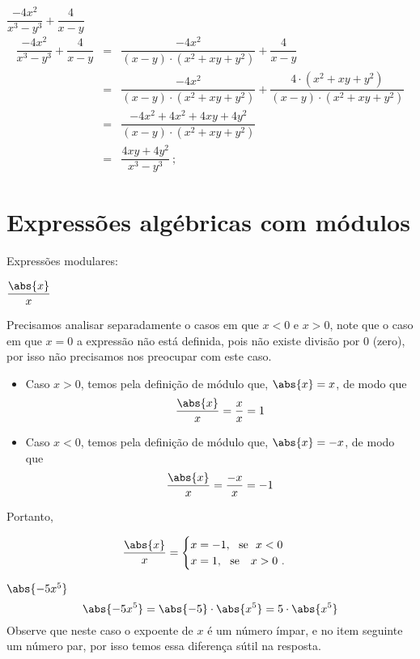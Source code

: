  \begin{exem}
  $\dfrac{-4x^2}{x^3 - y^3} + \dfrac{4}{x-y}$
  \begin{eqnarray*}
   \dfrac{-4x^2}{x^3 - y^3} + \dfrac{4}{x-y} & = & \dfrac{-4x^2}{(x-y)\cdot (x^2+xy+y^2)} + \dfrac{4}{x-y} \\
   &=& \dfrac{-4x^2}{(x-y)\cdot (x^2+xy+y^2)} + \dfrac{4 \cdot (x^2+xy+y^2)}{(x-y)\cdot (x^2+xy+y^2)} \\
   &=& \dfrac{-4x^2 + 4x^2 + 4xy + 4y^2}{(x-y) \cdot (x^2+xy+y^2)} \\
   &=& \dfrac{4xy + 4y^2}{x^3 - y^3}  \ ;
  \end{eqnarray*}
  \end{exem}
 

 
 \section{Expressões algébricas com módulos}
 
 Expressões modulares:

 \begin{exem}
  $\dfrac{\abs{x}}{x}$

  Precisamos analisar separadamente o casos em que $x<0$ e $x>0$, note que o caso em que $x=0$ a expressão não está definida, pois não existe divisão por $0$ (zero), por isso não precisamos nos preocupar com este caso.

  \begin{itemize}
   \item Caso $x> 0$, temos pela definição de módulo que, $\abs{x}= x$, de modo que
\begin{equation}
\dfrac{\abs{x}}{x}=\dfrac{x}{x}= 1
\end{equation}
   \item Caso $x< 0$, temos pela definição de módulo que, $\abs{x}= -x$, de modo que
\begin{equation}
\dfrac{\abs{x}}{x}=\dfrac{-x}{x}= -1
\end{equation}
  \end{itemize}

 Portanto,

  \[ \frac{\abs{x}}{x} = \begin{cases}
      x= -1, \ \ \text{se} \ \ x< 0 \\
      x= 1, \ \ \text{se } \ \ x> 0 \ .
     \end{cases}
  \]
\end{exem}
 
 \begin{exem}
  $\abs{-5x^5}$
\begin{equation}
\abs{-5x^5}= \abs{-5}\cdot \abs{x^5}= 5 \cdot \abs{x^5}
\end{equation}
 Observe que neste caso o expoente de $x$ é um número ímpar, e no item seguinte um número par, por isso temos essa diferença sútil na resposta.
 \end{exem}
 
